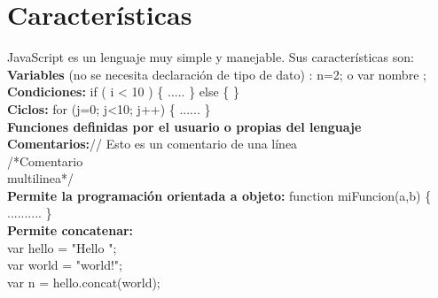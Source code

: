 \documentclass[11pt]{article} %
\begin{document}
\section{Características}
JavaScript es un lenguaje muy simple y manejable. Sus  características son:
\newline
\\
\textbf{Variables} (no se necesita declaración de tipo de dato) : n=2; o var nombre ;\\
\textbf{Condiciones:} if ( i < 10 ) \{ ..... \} else \{ \}\\
\textbf{Ciclos:} for (j=0; j<10; j++) \{ ...... \} \\
\textbf{Funciones definidas por el usuario o propias del lenguaje}\\
\textbf{Comentarios:}// Esto es un comentario de una línea\\
/*Comentario\\
multilinea*/   \\
\textbf{Permite la programación orientada a objeto:} function miFuncion(a,b) \{ .......... \} \\
\textbf{Permite concatenar:}\\
var hello = "Hello "; \\
var world = "world!";\\
var n = hello.concat(world);
\end{document}
